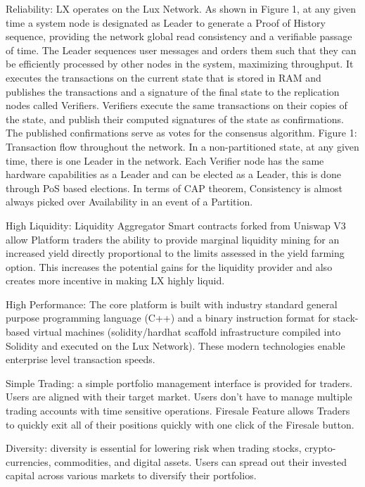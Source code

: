 \documentclass[11pt]{article}
\begin{document}
Reliability: LX operates on the Lux Network. As shown in Figure 1, at any given time a system node is designated as Leader to generate a Proof of History sequence, providing the network global read consistency and a verifiable passage of time. The Leader sequences user messages and orders them such that they can be efficiently processed by other nodes in the system, maximizing throughput. It executes the transactions on the current state that is stored in RAM and publishes the transactions and a signature of the final state to the replication nodes called Verifiers. Verifiers execute the same transactions on their copies of the state, and publish their computed signatures of the state as confirmations. The published confirmations serve as votes for the consensus algorithm. Figure 1: Transaction flow throughout the network. In a non-partitioned state, at any given time, there is one Leader in the network. Each Verifier node has the same hardware capabilities as a Leader and can be elected as a Leader, this is done through PoS based elections. In terms of CAP theorem, Consistency is almost always picked over Availability in an event of a Partition.


High Liquidity: Liquidity Aggregator Smart contracts forked from Uniswap V3 allow Platform traders the ability to provide marginal liquidity mining for an increased yield directly proportional to the limits assessed in the yield farming option.  This increases the potential gains for the liquidity provider and also creates more incentive in making LX highly liquid.


High Performance: The core platform is built with industry standard general purpose programming language (C++) and a binary instruction format for stack-based virtual machines (solidity/hardhat scaffold infrastructure compiled into Solidity and executed on the Lux Network). These modern technologies enable enterprise level transaction speeds.


Simple Trading: a simple portfolio management interface is provided for traders.  Users are aligned with their target market. Users don't have to manage multiple trading accounts with time sensitive operations. Firesale Feature allows Traders to quickly exit all of their positions quickly with one click of the Firesale button.


Diversity: diversity is essential for lowering risk when trading stocks, crypto-currencies, commodities, and digital assets. Users can spread out their invested capital across various markets to diversify their portfolios.
\end{document}
